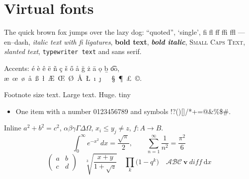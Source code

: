 \documentclass{article}\usepackage[OT1]{fontenc}\usepackage{mathptmx}
\begin{document}
\section{Virtual fonts}
The quick brown fox jumps over the lazy dog: ``quoted'', `single', fi fl ff ffi ffl --- en--dash,
\textit{italic text with fi ligatures}, \textbf{bold text}, \textbf{\textit{bold italic}},
\textsc{Small Caps Text}, \textsl{slanted text}, \texttt{typewriter text} and \textsf{sans serif}.

Accents: \'e \`e \^e \"e \~n \c{c} \v{s} \H{o} \r{a} \u{g} \.z \=a \d{o} \b{b} \t{oo},
\ae\ \oe\ \o\ \aa\ \ss\ \l\ \AE\ \OE\ \O\ \AA\ \L\ \i\ \j\ \dag\ \ddag\ \S\ \P\ \pounds\ \copyright.

{\footnotesize Footnote size text.} {\Large Large text.} {\Huge Huge.} {\tiny tiny}

\begin{itemize}\item One item with a number 0123456789 and symbols !?()[]/*+=@\&\%\$\#.\end{itemize}

Inline $a^2+b^2=c^2$, $\alpha\beta\gamma\Gamma\Delta\Omega$, $x_i \le y_j \ne z$, $f\colon A\to B$.
\[ \int_0^\infty e^{-x^2}\,dx = \frac{\sqrt{\pi}}{2}, \qquad \sum_{n=1}^{\infty}\frac{1}{n^2}=\frac{\pi^2}{6} \]
\[ \left(\begin{array}{cc} a & b\\ c & d\end{array}\right)\quad \sqrt[3]{\frac{x+y}{1+\sqrt{z}}}\quad \prod_{k}\bigl(1-q^k\bigr) \quad \mathcal{ABC}\ \mathbf{v}\ \mathit{diff}\ \mathrm{d}x \]
\end{document}
